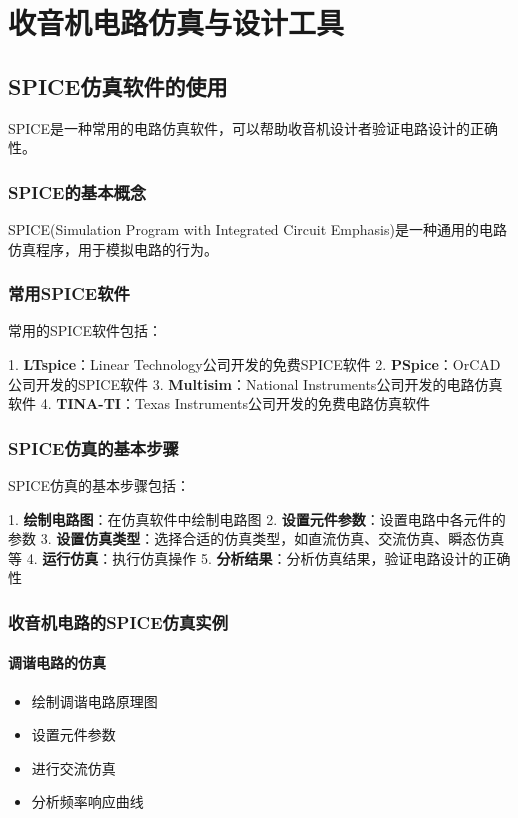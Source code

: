 \documentclass[12pt,UTF8]{ctexbook}
\begin{document}
\part{收音机电路仿真与设计工具}

\chapter{SPICE仿真软件的使用}

SPICE是一种常用的电路仿真软件，可以帮助收音机设计者验证电路设计的正确性。

\section{SPICE的基本概念}

SPICE(Simulation Program with Integrated Circuit Emphasis)是一种通用的电路仿真程序，用于模拟电路的行为。

\section{常用SPICE软件}

常用的SPICE软件包括：

1. \textbf{LTspice}：Linear Technology公司开发的免费SPICE软件
2. \textbf{PSpice}：OrCAD公司开发的SPICE软件
3. \textbf{Multisim}：National Instruments公司开发的电路仿真软件
4. \textbf{TINA-TI}：Texas Instruments公司开发的免费电路仿真软件

\section{SPICE仿真的基本步骤}

SPICE仿真的基本步骤包括：

1. \textbf{绘制电路图}：在仿真软件中绘制电路图
2. \textbf{设置元件参数}：设置电路中各元件的参数
3. \textbf{设置仿真类型}：选择合适的仿真类型，如直流仿真、交流仿真、瞬态仿真等
4. \textbf{运行仿真}：执行仿真操作
5. \textbf{分析结果}：分析仿真结果，验证电路设计的正确性

\section{收音机电路的SPICE仿真实例}

\subsection{调谐电路的仿真}\begin{itemize}
  \item 绘制调谐电路原理图
  \item 设置元件参数
  \item 进行交流仿真
  \item 分析频率响应曲线\end{itemize}
\end{document}
